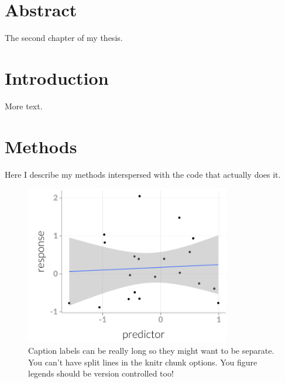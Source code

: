 
\clearpage









\section{Abstract}

The second chapter of my thesis.





\section{Introduction}


More text.


\section{Methods}

Here I describe my methods interspersed with the code that actually does it.











\begin{knitrout}\footnotesize
{}\color{fgcolor}\begin{figure}[t]

{\centering \includegraphics[width=0.8\textwidth]{figure/figPlots-1} 

}

\caption[A cruddy figure.]{
Caption labels can be really long so they might want to be separate. 
You can't have split lines in the knitr chunk options.
You figure legends should be version controlled too!
}\label{f:figPlots}
\end{figure}


\end{knitrout}

